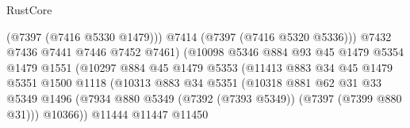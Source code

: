 \begin{lexlean}{RustCore}
\begin{coremodule}
                                            (@7397 (@7416 @5330 @1479)))
                                          @7414
                                          (@7397 (@7416 @5320 @5336)))
                                        @7432
                                        @7436
                                        @7441
                                        @7446
                                        @7452
                                        @7461)
                                      (@10098
                                        @5346
                                        @884
                                        @93
                                        @45
                                        @1479
                                        @5354
                                        @1479
                                        @1551
                                        (@10297
                                          @884
                                          @45
                                          @1479
                                          @5353
                                          (@11413
                                            @883
                                            @34
                                            @45
                                            @1479
                                            @5351
                                            @1500
                                            @1118
                                            (@10313
                                              @883
                                              @34
                                              @5351
                                              (@10318
                                                @881
                                                @62
                                                @31
                                                @33
                                                @5349
                                                @1496
                                                (@7934
                                                  @880
                                                  @5349
                                                  (@7392 (@7393 @5349))
                                                  (@7397 (@7399 @880 @31)))
                                                @10366))
                                            @11444
                                            @11447
                                            @11450

\end{coremodule}
\end{lexlean}
